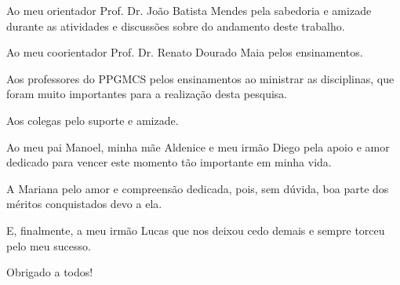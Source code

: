 \agradecimentos

Ao meu orientador Prof. Dr. João Batista Mendes pela sabedoria e amizade durante as atividades e discussões sobre do andamento deste trabalho.

Ao meu coorientador Prof. Dr. Renato Dourado Maia pelos ensinamentos.

Aos professores do PPGMCS pelos ensinamentos ao ministrar as disciplinas, que foram muito importantes para a realização desta pesquisa.

Aos colegas pelo suporte e amizade.

Ao meu pai Manoel, minha mãe Aldenice e meu irmão Diego pela apoio e amor dedicado para vencer este momento tão importante em minha vida.

A Mariana pelo amor e compreensão dedicada, pois, sem dúvida, boa parte dos méritos conquistados devo a ela.

E, finalmente, a meu irmão Lucas que nos deixou cedo demais e sempre torceu pelo meu sucesso.

Obrigado a todos!
